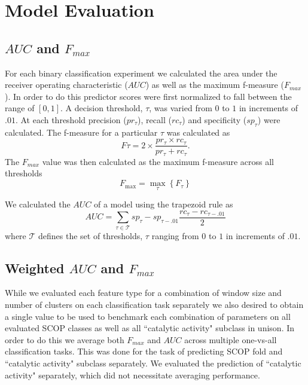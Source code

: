 \section{Model Evaluation}


\subsection{$AUC$ and $F_{max}$}

For each binary classification experiment we calculated the area under the receiver operating characteristic ($AUC$) as well as the maximum f-measure ($F_{max}$).  In order to do this predictor scores were first normalized to fall between the range of $[0,1]$.  A decision threshold, $\tau$, was varied from $0$ to $1$ in increments of $.01$.  At each threshold precision ($pr_{\tau}$), recall ($rc_{\tau}$) and specificity ($sp_{\tau}$) were calculated.  The f-measure for a particular $\tau$ was calculated as
\[
F\tau = 2\times \frac{pr_{\tau}\times rc_{\tau}}{pr_{\tau}+rc_{\tau}}.
\]
The $F_{max}$ value was then calculated as the maximum f-measure across all thresholds
\[
F_{\max}=\underset{\tau}{\max}\left\{ F_{\tau} \right\}
\]

We calculated the $AUC$ of a model using the trapezoid rule as 
\[
AUC = \sum_{\tau \in \mathcal{T}} sp_{\tau} - sp_{\tau -.01}  \frac{ rc_{\tau} - rc_{\tau -.01} }{2}
\]
where $\mathcal{T}$ defines the set of thresholds, $\tau$ ranging from $0$ to $1$ in increments of $.01$.

\subsection{Weighted $AUC$ and $F_{max}$}
\label{sec:vqweightedmetrics}
While we evaluated each feature type for a combination of window size and number of clusters on each classification task separately we also desired to obtain a single value to be used to benchmark each combination of parameters on all evaluated SCOP classes as well as all ``catalytic activity" subclass in unison.  In order to do this we average both $F_{max}$ and $AUC$ across multiple one-vs-all classification tasks. This was done for the task of predicting SCOP fold and ``catalytic activity" subclass separately. We evaluated the prediction of ``catalytic activity" separately, which did not necessitate averaging performance. 

